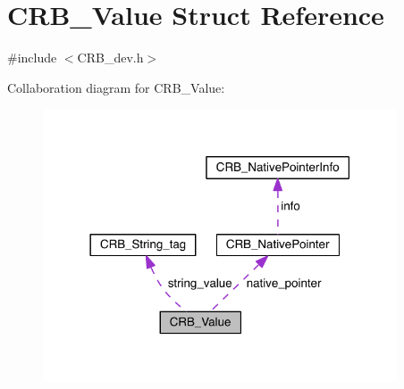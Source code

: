 \hypertarget{struct_c_r_b___value}{}\section{C\+R\+B\+\_\+\+Value Struct Reference}
\label{struct_c_r_b___value}


{\ttfamily \#include $<$C\+R\+B\+\_\+dev.\+h$>$}



Collaboration diagram for C\+R\+B\+\_\+\+Value\+:\nopagebreak
\begin{figure}[H]
\begin{center}
\leavevmode
\includegraphics[width=297pt]{struct_c_r_b___value__coll__graph}
\end{center}
\end{figure}
